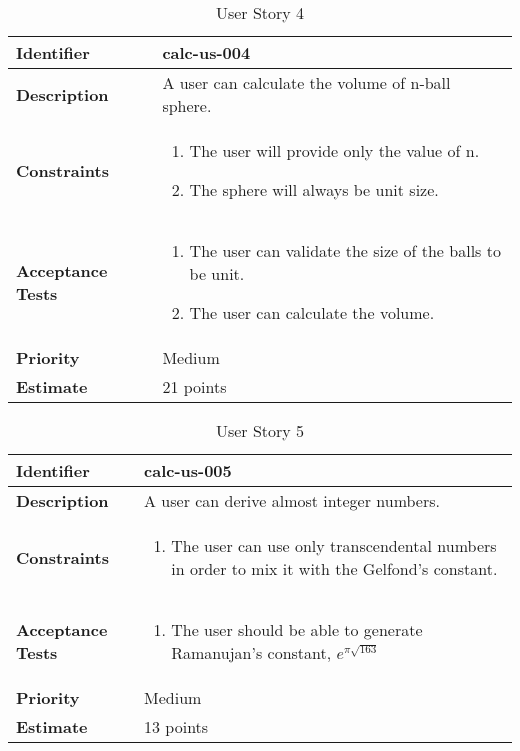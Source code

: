 \documentclass{article}
\begin{document}
\begin{table}[h]
\centering
\begin{tabular}{|p{2.2cm}|p{12cm}|}
\hline
\textbf{Identifier} & {calc-us-004} \\
\hline
\textbf{Description} & {A user can calculate the volume of n-ball sphere.}\\
\hline
\textbf{Constraints} & 
\begin{enumerate}
    \item The user will provide only the value of n.
    \item The sphere will always be unit size. 
\end{enumerate}\\
\hline
\textbf{Acceptance Tests} & 
\begin{enumerate}
    \item The user can validate the size of the balls to be unit.
    \item The user can calculate the volume.
\end{enumerate}\\
\hline
\textbf{Priority} & {Medium}\\
\hline
\textbf{Estimate} & {21 points}\\
\hline
\end{tabular}
\caption{User Story 4}
\end{table}

\begin{table}[h]
\centering
\begin{tabular}{|p{2.2cm}|p{12cm}|}
\hline
\textbf{Identifier} & {calc-us-005} \\
\hline
\textbf{Description} & {A user can derive almost integer numbers.}\\
\hline
\textbf{Constraints} & 
\begin{enumerate}
    \item The user can use only transcendental numbers in order to mix it with the Gelfond's constant.
\end{enumerate}\\
\hline
\textbf{Acceptance Tests} & 
\begin{enumerate}
    \item The user should be able to generate Ramanujan's constant, $e^{\pi \sqrt{163}}$
\end{enumerate}\\
\hline
\textbf{Priority} & {Medium}\\
\hline
\textbf{Estimate} & {13 points}\\
\hline
\end{tabular}
\caption{User Story 5}
\end{table}
\end{document}

